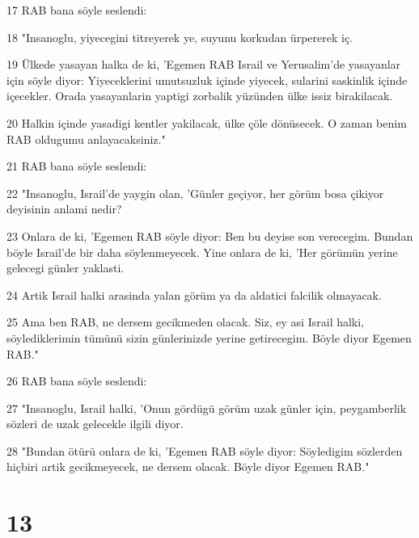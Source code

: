 \par 17 RAB bana söyle seslendi:
\par 18 "Insanoglu, yiyecegini titreyerek ye, suyunu korkudan ürpererek iç.
\par 19 Ülkede yasayan halka de ki, 'Egemen RAB Israil ve Yerusalim'de yasayanlar için söyle diyor: Yiyeceklerini umutsuzluk içinde yiyecek, sularini saskinlik içinde içecekler. Orada yasayanlarin yaptigi zorbalik yüzünden ülke issiz birakilacak.
\par 20 Halkin içinde yasadigi kentler yakilacak, ülke çöle dönüsecek. O zaman benim RAB oldugumu anlayacaksiniz."
\par 21 RAB bana söyle seslendi:
\par 22 "Insanoglu, Israil'de yaygin olan, 'Günler geçiyor, her görüm bosa çikiyor deyisinin anlami nedir?
\par 23 Onlara de ki, 'Egemen RAB söyle diyor: Ben bu deyise son verecegim. Bundan böyle Israil'de bir daha söylenmeyecek. Yine onlara de ki, 'Her görümün yerine gelecegi günler yaklasti.
\par 24 Artik Israil halki arasinda yalan görüm ya da aldatici falcilik olmayacak.
\par 25 Ama ben RAB, ne dersem gecikmeden olacak. Siz, ey asi Israil halki, söylediklerimin tümünü sizin günlerinizde yerine getirecegim. Böyle diyor Egemen RAB."
\par 26 RAB bana söyle seslendi:
\par 27 "Insanoglu, Israil halki, 'Onun gördügü görüm uzak günler için, peygamberlik sözleri de uzak gelecekle ilgili diyor.
\par 28 "Bundan ötürü onlara de ki, 'Egemen RAB söyle diyor: Söyledigim sözlerden hiçbiri artik gecikmeyecek, ne dersem olacak. Böyle diyor Egemen RAB."

\chapter{13}

